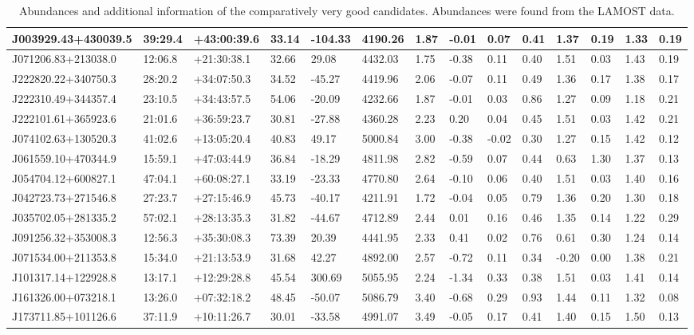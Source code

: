 \documentclass[a4paper,fleqn,usenatbib]{mnras}
\begin{document}
\begin{table}
{\begin{tabular}{@{}llllllllllllll@{}}
				J003929.43+430039.5 & 39:29.4 & +43:00:39.6 & 33.14 & -104.33 & 4190.26 & 1.87 & -0.01 & 0.07 & 0.41 & 1.37 & 0.19 & 1.33 & 0.19 \\ \midrule
				J071206.83+213038.0 & 12:06.8 & +21:30:38.1 & 32.66 & 29.08 & 4432.03 & 1.75 & -0.38 & 0.11 & 0.40 & 1.51 & 0.03 & 1.43 & 0.19 \\ \midrule
				J222820.22+340750.3 & 28:20.2 & +34:07:50.3 & 34.52 & -45.27 & 4419.96 & 2.06 & -0.07 & 0.11 & 0.49 & 1.36 & 0.17 & 1.38 & 0.17 \\ \midrule
				J222310.49+344357.4 & 23:10.5 & +34:43:57.5 & 54.06 & -20.09 & 4232.66 & 1.87 & -0.01 & 0.03 & 0.86 & 1.27 & 0.09 & 1.18 & 0.21 \\ \midrule
				J222101.61+365923.6 & 21:01.6 & +36:59:23.7 & 30.81 & -27.88 & 4360.28 & 2.23 & 0.20 & 0.04 & 0.45 & 1.51 & 0.03 & 1.42 & 0.21 \\ \midrule
				J074102.63+130520.3 & 41:02.6 & +13:05:20.4 & 40.83 & 49.17 & 5000.84 & 3.00 & -0.38 & -0.02 & 0.30 & 1.27 & 0.15 & 1.42 & 0.12 \\ \midrule
				J061559.10+470344.9 & 15:59.1 & +47:03:44.9 & 36.84 & -18.29 & 4811.98 & 2.82 & -0.59 & 0.07 & 0.44 & 0.63 & 1.30 & 1.37 & 0.13 \\ \midrule
				J054704.12+600827.1 & 47:04.1 & +60:08:27.1 & 33.19 & -23.33 & 4770.80 & 2.64 & -0.10 & 0.06 & 0.40 & 1.51 & 0.03 & 1.40 & 0.16 \\ \midrule
				J042723.73+271546.8 & 27:23.7 & +27:15:46.9 & 45.73 & -40.17 & 4211.91 & 1.72 & -0.04 & 0.05 & 0.79 & 1.36 & 0.20 & 1.30 & 0.18 \\ \midrule
				J035702.05+281335.2 & 57:02.1 & +28:13:35.3 & 31.82 & -44.67 & 4712.89 & 2.44 & 0.01 & 0.16 & 0.46 & 1.35 & 0.14 & 1.22 & 0.29 \\ \midrule
				J091256.32+353008.3 & 12:56.3 & +35:30:08.3 & 73.39 & 20.39 & 4441.95 & 2.33 & 0.41 & 0.02 & 0.76 & 0.61 & 0.30 & 1.24 & 0.14 \\ \midrule
				J071534.00+211353.8 & 15:34.0 & +21:13:53.9 & 31.68 & 42.27 & 4892.00 & 2.57 & -0.72 & 0.11 & 0.34 & -0.20 & 0.00 & 1.38 & 0.21 \\ \midrule
				J101317.14+122928.8 & 13:17.1 & +12:29:28.8 & 45.54 & 300.69 & 5055.95 & 2.24 & -1.34 & 0.33 & 0.38 & 1.51 & 0.03 & 1.41 & 0.14 \\ \midrule
				J161326.00+073218.1 & 13:26.0 & +07:32:18.2 & 48.45 & -50.07 & 5086.79 & 3.40 & -0.68 & 0.29 & 0.93 & 1.44 & 0.11 & 1.32 & 0.08 \\ \midrule
				J173711.85+101126.6 & 37:11.9 & +10:11:26.7 & 30.01 & -33.58 & 4991.07 & 3.49 & -0.05 & 0.17 & 0.41 & 1.40 & 0.15 & 1.50 & 0.13 \\ \bottomrule
			\end{tabular}%
		}
		\caption{Abundances and additional information of the comparatively very good candidates. Abundances were found from the LAMOST data.}
		\label{Eu for the great 22}
	\end{table}
	
	\label{lastpage}
\end{document}
